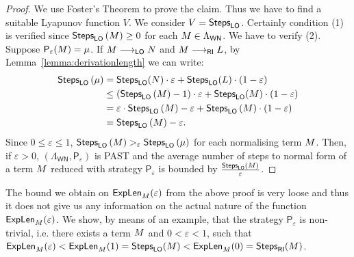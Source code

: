 \begin{proof}
	We use Foster's Theorem to prove the claim. Thus we have to find a suitable Lyapunov function $V$.
	We consider $V=\textsf{Steps}_{\textsf{LO}}$. Certainly condition (1) is verified since $\textsf{Steps}_{\textsf{LO}}\left(M\right)\geq0$ for each $M\in\Lambda_\mathsf{WN}$. We have to verify (2). Suppose $\mathsf{P}_\varepsilon(M)=\mu$. If $M\longrightarrow_{\textsf{LO}}N$ and $M\longrightarrow_{\textsf{RI}}L$, by Lemma~\ref{lemma:derivationlength} we can write:
	\begin{equation*}
	\begin{split}
	\textsf{Steps}_{\textsf{LO}}\left( \mu\right) & = \textsf{Steps}_{\textsf{LO}}(N) \cdot \varepsilon+ \textsf{Steps}_{\textsf{LO}}(L)\cdot (1-\varepsilon)\\
	& \leq \left( \textsf{Steps}_{\textsf{LO}}\left( M\right)-1\right)  \cdot \varepsilon + \textsf{Steps}_{\textsf{LO}}(M)\cdot (1-\varepsilon)\\
	& = \varepsilon\cdot\textsf{Steps}_{\textsf{LO}}\left( M\right)-\varepsilon + \textsf{Steps}_{\textsf{LO}}\left( M\right)\cdot\left( 1-\varepsilon\right)\\
	& = \textsf{Steps}_{\textsf{LO}}\left( M\right)-\varepsilon.
	\end{split}
	\end{equation*}
	Since $0\leq\varepsilon\leq 1$, $\textsf{Steps}_{\textsf{LO}}\left(M\right)>_{\varepsilon}\textsf{Steps}_{\textsf{LO}}\left(\mu\right)$ for each normalising term $M$.
	Then, if $\varepsilon>0$, $(\Lambda_\mathsf{WN},\mathsf{P}_\varepsilon)$ is PAST and the average number of steps to normal form of a term $M$ reduced with strategy $\mathsf{P}_\varepsilon$ is bounded by
	$\frac{\textsf{Steps}_{\textsf{LO}}\left( M\right)}{\varepsilon}$.
\end{proof}
The bound we obtain on $\textsf{ExpLen}_{M}(\varepsilon)$ from the above proof is very loose and thus it does not give us any information on the actual nature of the function $\textsf{ExpLen}_{M}(\varepsilon)$. We show, by means of an example, that the strategy $\mathsf{P}_\varepsilon$ is non-trivial, i.e. there exists a term $M$ and $0<\varepsilon<1$, such that $\textsf{ExpLen}_{M}(\varepsilon)<\textsf{ExpLen}_{M}(1)=\textsf{Steps}_{\textsf{LO}}(M)<\textsf{ExpLen}_{M}(0)=\textsf{Steps}_{\textsf{RI}}(M)$.
